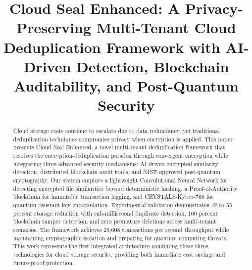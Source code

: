 \documentclass[conference]{IEEEtran}
\begin{document}
\title{Cloud Seal Enhanced: A Privacy-Preserving Multi-Tenant Cloud Deduplication Framework with AI-Driven Detection, Blockchain Auditability, and Post-Quantum Security}

\author{
\and
{}
}

\maketitle

\begin{abstract}
Cloud storage costs continue to escalate due to data redundancy, yet traditional deduplication techniques compromise privacy when encryption is applied. This paper presents Cloud Seal Enhanced, a novel multi-tenant deduplication framework that resolves the encryption-deduplication paradox through convergent encryption while integrating three advanced security mechanisms: AI-driven encrypted similarity detection, distributed blockchain audit trails, and NIST-approved post-quantum cryptography. Our system employs a lightweight Convolutional Neural Network for detecting encrypted file similarities beyond deterministic hashing, a Proof-of-Authority blockchain for immutable transaction logging, and CRYSTALS-Kyber-768 for quantum-resistant key encapsulation. Experimental validation demonstrates 42 to 55 percent storage reduction with sub-millisecond duplicate detection, 100 percent blockchain tamper detection, and zero premature deletions across multi-tenant scenarios. The framework achieves 29,608 transactions per second throughput while maintaining cryptographic isolation and preparing for quantum computing threats. This work represents the first integrated architecture combining these three technologies for cloud storage security, providing both immediate cost savings and future-proof protection.
\end{abstract}
\end{document}
